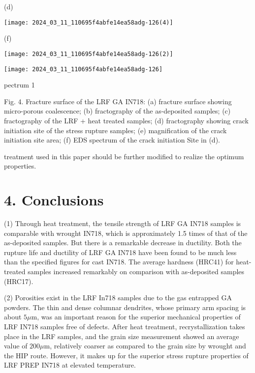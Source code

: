 \documentclass[10pt]{article}
\begin{document}
(d)

\begin{center}
\texttt{[image: 2024\_03\_11\_110695f4abfe14ea58adg-126(4)]}
\end{center}

(f)

\begin{center}
\texttt{[image: 2024\_03\_11\_110695f4abfe14ea58adg-126(2)]}
\end{center}

\begin{center}
\texttt{[image: 2024\_03\_11\_110695f4abfe14ea58adg-126]}
\end{center}

pectrum 1

Fig. 4. Fracture surface of the LRF GA IN718: (a) fracture surface showing micro-porous coalescence; (b) fractography of the as-deposited samples; (c) fractography of the LRF + heat treated samples; (d) fractography showing crack initiation site of the stress rupture samples; (e) magnification of the crack initiation site area; (f) EDS spectrum of the crack initiation Site in (d).

treatment used in this paper should be further modified to realize the optimum properties.

\section*{4. Conclusions}
(1) Through heat treatment, the tensile strength of LRF GA IN718 samples is comparable with wrought IN718, which is approximately 1.5 times of that of the as-deposited samples. But there is a remarkable decrease in ductility. Both the rupture life and ductility of LRF GA IN718 have been found to be much less than the specified figures for cast IN718. The average hardness (HRC41) for heat-treated samples increased remarkably on comparison with as-deposited samples (HRC17).

(2) Porosities exist in the LRF In718 samples due to the gas entrapped GA powders. The thin and dense columnar dendrites, whose primary arm spacing is about $5 \mu \mathrm{m}$, was an important reason for the superior mechanical properties of LRF IN718 samples free of defects. After heat treatment, recrystallization takes place in the LRF samples, and the grain size measurement showed an average value of $200 \mu \mathrm{m}$, relatively coarser as compared to the grain size by wrought and the HIP route. However, it makes up for the superior stress rupture properties of LRF PREP IN718 at elevated temperature.
\end{document}

